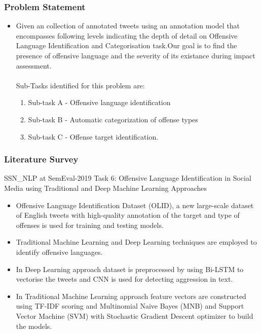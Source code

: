 \documentclass{beamer}
\begin{document}
\begin{frame}\frametitle{Problem Statement}
  
    \begin{itemize}
\item Given an collection of annotated tweets using an annotation model that encompasses following levels indicating the depth of detail on Offensive Language Identification and Categorisation task.Our goal is to find the presence of offensive language and the severity of its existance during impact assessment.\\~\\
Sub-Tasks identified for this problem are:
\begin{enumerate}
	\item Sub-task A - Offensive language identification
	\item Sub-task B - Automatic categorization of offense types
	\item Sub-task C - Offense target identification.
\end{enumerate}
    \end{itemize}
\end{frame}
\begin{frame}\frametitle{Literature Survey}
    SSN\_NLP at SemEval-2019 Task 6: Offensive Language Identification in Social Media using Traditional and Deep Machine Learning Approaches\cite{ssnNLPSemEvalT6}
  \begin{itemize}
\item Offensive Language Identification Dataset (OLID), a new large-scale dataset of English tweets with high-quality annotation of the target and type
of offenses is used for training and testing models\cite{zampierietal2019}.
\item Traditional Machine Learning and Deep Learning techniques are employed to identify offensive languages.
\item In Deep Learning approach dataset is preprocessed by using Bi-LSTM to vectorise the tweets and CNN is used for detecting aggression in text.
\item In Traditional Machine Learning approach feature vectors are constructed using TF-IDF scoring and Multinomial Naive Bayes (MNB) and Support Vector Machine (SVM) with Stochastic Gradient Descent optimizer to build the models.   
\end{itemize}
\end{frame}
\end{document}

